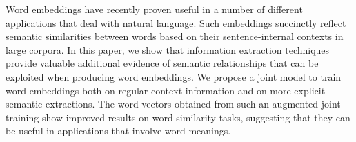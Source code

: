 Word embeddings have recently proven useful in a number of different applications that deal with natural language. Such embeddings succinctly reflect semantic similarities between words based on their sentence-internal contexts in large corpora. In this paper, we show that information extraction techniques provide valuable additional evidence of semantic relationships that can be exploited when producing word embeddings. We propose a joint model to train word embeddings both on regular context information and on more explicit semantic extractions. The word vectors obtained from such an augmented joint training show improved results on word similarity tasks, suggesting that they can be useful in applications that involve word meanings.
